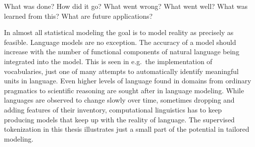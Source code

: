 What was done?
How did it go?
What went wrong?
What went well?
What was learned from this?
What are future applications?

In almost all statistical modeling the goal is to model reality as precisely as feasible.
Language models are no exception.
The accuracy of a model should increase with the number of functional components of natural language being integrated into the model.
This is seen in e.g.\ the implementation of vocabularies, just one of many attempts to automatically identify meaningful units in language.
Even higher levels of language found in domains from ordinary pragmatics to scientific reasoning are sought after in language modeling.
While languages are observed to change slowly over time, sometimes dropping and adding features of their inventory, computational linguistics has to keep producing models that keep up with the reality of language.
The supervised tokenization in this thesis illustrates just a small part of the potential in tailored modeling.
